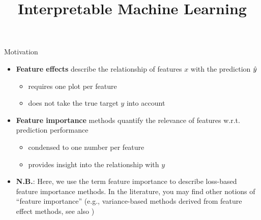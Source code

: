 \documentclass[11pt,compress,t,notes=noshow, aspectratio=169, xcolor=table]{beamer}
\title{Interpretable Machine Learning}
\date{}
\begin{document}
    
    \newcommand{\titlefigure}{figure_man/feature-importance.png}
    \newcommand{\learninggoals}{
    	\item Understand motivation for feature importance
    	\item Develop an intuition for possible use-cases
    	\item Know characteristics of feature importance methods}
	
	
	
	

	

\begin{frame}{Motivation}
\begin{itemize}
  \item<1-3> \textbf{Feature effects} describe the relationship of features $x$ with the prediction $\yh$
  \begin{itemize}
    \item requires one plot per feature
    \item does not take the true target $y$ into account
  \end{itemize}
  \item<2-3> \textbf{Feature importance} methods quantify the relevance of features w.r.t. prediction performance
  \begin{itemize}
    \item condensed to one number per feature
    \item provides insight into the relationship with $y$
  \end{itemize}
  \item<3> \textbf{N.B.}: 
  Here, we use the term feature importance to describe loss-based feature importance methods. In the literature, you may find other notions of ``feature importance'' (e.g., variance-based methods derived from feature effect methods, see also )
\end{itemize}
\end{frame}
\end{document}
